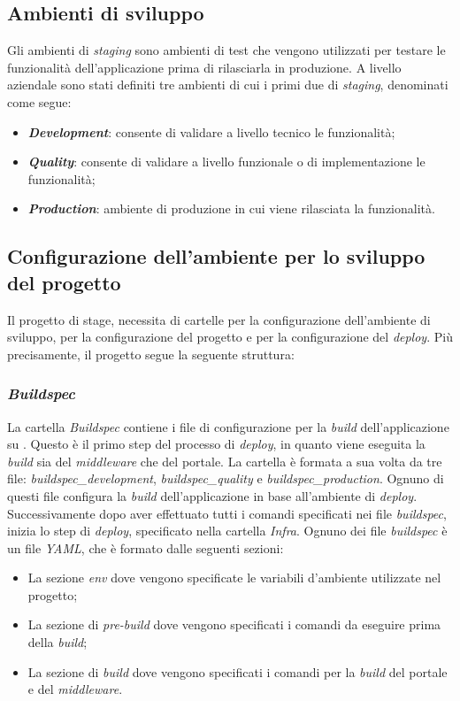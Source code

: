 \subsection{Ambienti di sviluppo}
Gli ambienti di \textit{staging} sono ambienti di test che vengono utilizzati per testare le funzionalità dell'applicazione prima di rilasciarla in produzione.
A livello aziendale sono stati definiti tre ambienti di cui i primi due di \textit{staging}, denominati come segue:
\begin{itemize}
  \item \textbf{\textit{Development}}: consente di validare a livello tecnico le funzionalità;
  \item \textbf{\textit{Quality}}: consente di validare a livello funzionale o di implementazione le funzionalità;
  \item \textbf{\textit{Production}}: ambiente di produzione in cui viene rilasciata la funzionalità.
\end{itemize}

\subsection{Configurazione dell'ambiente per lo sviluppo del progetto}
Il progetto di stage, necessita di cartelle per la configurazione dell'ambiente di sviluppo, per la configurazione del progetto e per la configurazione del \textit{deploy}.
Più precisamente, il progetto segue la seguente struttura:

\subsubsection*{\emph{Buildspec}}
La cartella \textit{Buildspec} contiene i file di configurazione per la \textit{build} dell'applicazione su .
Questo è il primo step del processo di \textit{deploy}, in quanto viene eseguita la \textit{build} sia del \textit{middleware} che del portale.
La cartella è formata a sua volta da tre file: \textit{buildspec\_development}, \textit{buildspec\_quality} e \textit{buildspec\_production}. 
Ognuno di questi file configura la \textit{build} dell'applicazione in base all'ambiente di \textit{deploy}.\\
Successivamente dopo aver effettuato tutti i comandi specificati nei file \textit{buildspec}, inizia lo step di \textit{deploy}, specificato nella cartella \textit{Infra}.
Ognuno dei file \textit{buildspec} è un file \textit{YAML}, che è formato dalle seguenti sezioni:
\begin{itemize}
  \item La sezione \textit{env} dove vengono specificate le variabili d'ambiente utilizzate nel progetto;
  \item La sezione di \textit{pre-build} dove vengono specificati i comandi da eseguire prima della \textit{build};
  \item La sezione di \textit{build} dove vengono specificati i comandi per la \textit{build} del portale e del \textit{middleware}.
\end{itemize}


